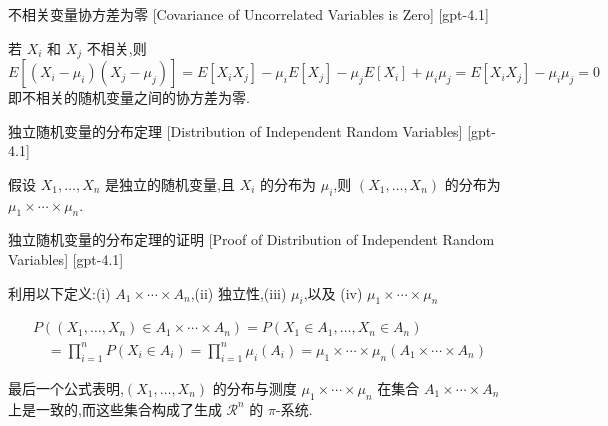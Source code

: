 \documentclass[UTF8]{ctexart}
\begin{document}
    
    
    \begin{thm}
        {不相关变量协方差为零}
        [Covariance of Uncorrelated Variables is Zero]
        [gpt-4.1]
        
若 $X_i$ 和 $X_j$ 不相关,则
\[
E\left[(X_i - \mu_i)(X_j - \mu_j)\right] = E[X_i X_j] - \mu_i E[X_j] - \mu_j E[X_i] + \mu_i \mu_j = E[X_i X_j] - \mu_i \mu_j = 0
\]
即不相关的随机变量之间的协方差为零.

    \end{thm}
    
    
    
    \begin{thm}
        {独立随机变量的分布定理}
        [Distribution of Independent Random Variables]
        [gpt-4.1]
        
假设 $X_{1}, \ldots, X_{n}$ 是独立的随机变量,且 $X_{i}$ 的分布为 $\mu_{i}$,则 $(X_{1}, \ldots, X_{n})$ 的分布为 $\mu_{1} \times \cdots \times \mu_{n}$.

    \end{thm}
    
    
    
    \begin{prf}
        {独立随机变量的分布定理的证明}
        [Proof of Distribution of Independent Random Variables]
        [gpt-4.1]
        
利用以下定义:(i) $A_{1} \times \cdots \times A_{n}$,(ii) 独立性,(iii) $\mu_{i}$,以及 (iv) $\mu_{1} \times \cdots \times \mu_{n}$

\[
\begin{array}{l}
{\displaystyle P\left((X_{1}, \ldots, X_{n}) \in A_{1} \times \cdots \times A_{n}\right) = P\left(X_{1} \in A_{1}, \ldots, X_{n} \in A_{n}\right)} \\
{\displaystyle \quad = \prod_{i=1}^{n} P\left(X_{i} \in A_{i}\right) = \prod_{i=1}^{n} \mu_{i}(A_{i}) = \mu_{1} \times \cdots \times \mu_{n}\left(A_{1} \times \cdots \times A_{n}\right)}
\end{array}
\]

最后一个公式表明,$(X_{1}, \ldots, X_{n})$ 的分布与测度 $\mu_{1} \times \cdots \times \mu_{n}$ 在集合 $A_{1} \times \cdots \times A_{n}$ 上是一致的,而这些集合构成了生成 $\mathcal{R}^{n}$ 的 $\pi$-系统.

    \end{prf}
    
\end{document}
